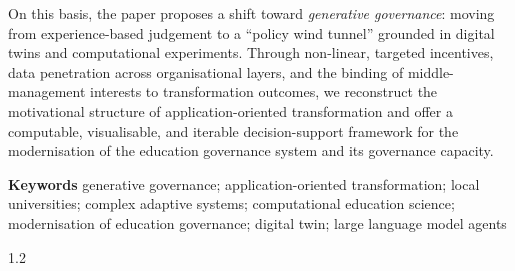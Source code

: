 \documentclass[UTF8, zihao=-4, fontset=mac]{ctexart}
\begin{document}
On this basis, the paper proposes a shift toward \emph{generative governance}: moving from experience-based judgement to a “policy wind tunnel” grounded in digital twins and computational experiments. Through non-linear, targeted incentives, data penetration across organisational layers, and the binding of middle-management interests to transformation outcomes, we reconstruct the motivational structure of application-oriented transformation and offer a computable, visualisable, and iterable decision-support framework for the modernisation of the education governance system and its governance capacity.

\vspace{0.8em}
\noindent{}\textbf{Keywords}\quad
generative governance; application-oriented transformation; local universities; complex adaptive systems; computational education science; modernisation of education governance; digital twin; large language model agents


\vspace{1cm}
\begin{spacing}{1.2} %

\end{spacing}
\end{document}
